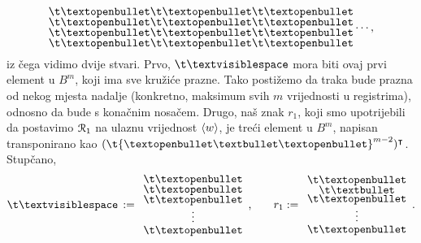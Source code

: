 \begin{equation}
\begin{array}{@{}c@{}}
    \t\textopenbullet\\
    \t\textopenbullet\\
    \t\textopenbullet\\
    \t\textopenbullet
    \end{array}
    \begin{array}{@{}c@{}}
    \t\textopenbullet\\
    \t\textopenbullet\\
    \t\textopenbullet\\
    \t\textopenbullet
    \end{array}
    \begin{array}{@{}c@{}}
    \t\textopenbullet\\
    \t\textopenbullet\\
    \t\textopenbullet\\
    \t\textopenbullet
    \end{array}\dotsm\text,
\end{equation}
iz čega vidimo dvije stvari. Prvo, $\bl$ mora biti ovaj prvi element u $B^m$, koji ima sve kružiće prazne. Tako postižemo da traka bude prazna od nekog mjesta nadalje (konkretno, maksimum svih $m$ vrijednosti u registrima), odnosno da bude s konačnim nosačem. Drugo, naš znak $r_1$, koji smo upotrijebili da postavimo $\mathcal R_{1}$ na ulaznu vrijednost $\langle w\rangle$, je treći element u $B^m$, napisan transponirano kao $(\t{\textopenbullet\textbullet\textopenbullet}^{m-2})^\intercal$. Stupčano,
\begin{equation}
\renewcommand{\arraystretch}{0.1}
    \bl\,:=\begin{array}{c}
    \t\textopenbullet\\
    \t\textopenbullet\\
        \t\textopenbullet\\[0mm]
        \vdotswithin{\t\textopenbullet}\\[1mm]
    \t\textopenbullet
    \end{array}\text{,\qquad}
    r_1:=\begin{array}{c}
    \t\textopenbullet\\
    \t\textbullet\\
        \t\textopenbullet\\[0mm]
        \vdotswithin{\t\textopenbullet}\\[1mm]
    \t\textopenbullet
    \end{array}\text.
\end{equation}

